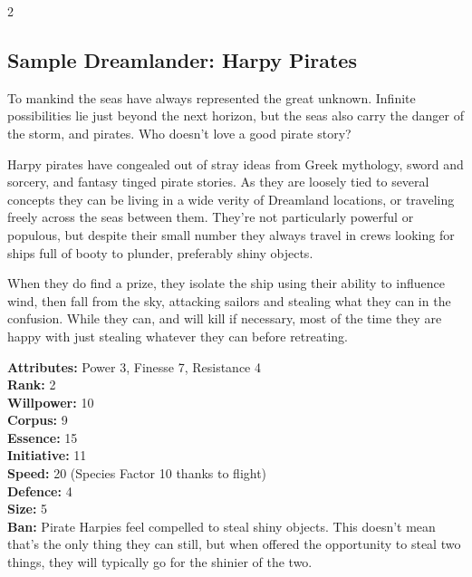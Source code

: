 \begin{multicols}{2}
\subsection*{Sample Dreamlander: Harpy Pirates}
To mankind the seas have always represented the great unknown. Infinite possibilities lie just beyond  the next horizon, but the seas also carry the danger of the storm, and pirates. Who doesn't love a good pirate story? 

Harpy pirates have congealed out of stray ideas from Greek mythology, sword and sorcery, and fantasy tinged pirate stories. As they are loosely tied to several concepts they can be living in a wide verity of Dreamland locations, or traveling freely across the seas between them. They're not particularly powerful or populous, but despite their small number they always travel in crews looking for ships full of booty to plunder, preferably shiny objects. 

When they do find a prize, they isolate the ship using their ability to influence wind, then fall from the sky, attacking sailors and stealing what they can in the confusion. While they can, and will kill if necessary, most of the time they are happy with just stealing whatever they can before retreating.

\noindent \textbf{Attributes:} Power 3, Finesse 7, Resistance 4\\

\noindent \textbf{Rank:} 2\\

\noindent \textbf{Willpower:} 10\\

\noindent \textbf{Corpus:} 9\\

\noindent \textbf{Essence:} 15\\

\noindent \textbf{Initiative:} 11\\

\noindent \textbf{Speed:} 20 (Species Factor 10 thanks to flight)\\

\noindent \textbf{Defence:} 4\\

\noindent \textbf{Size:} 5\\

\noindent \textbf{Ban:} Pirate Harpies feel compelled to steal shiny objects. This doesn’t mean that’s the only thing they can still, but when offered the opportunity to steal two things, they will typically go for the shinier of the two.\\


\end{multicols}
